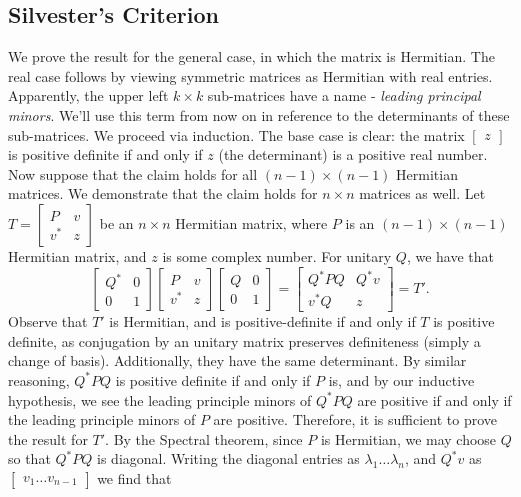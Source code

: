 \documentclass{scrartcl}
\begin{document}
\subsection{Silvester's Criterion}
\begin{solution}
    We prove the result for the general case, in which the matrix is Hermitian. The real case follows by viewing symmetric matrices as Hermitian with real entries. Apparently, the upper left $k\times k$ sub-matrices have a name - \textit{leading principal minors}. We'll use this term from now on in reference to the determinants of these sub-matrices. We proceed via induction. The base case is clear: the matrix $\begin{bmatrix} z \end{bmatrix}$ is positive definite if and only if $z$ (the determinant) is a positive real number. Now suppose that the claim holds for all $(n-1) \times (n-1)$ Hermitian matrices. We demonstrate that the claim holds for $n\times n$ matrices as well. Let $T=\begin{bmatrix} P & v \\ v^\ast & z \end{bmatrix}$ be an $n\times n$ Hermitian matrix, where $P$ is an $(n-1) \times (n-1)$ Hermitian matrix, and $z$ is some complex number. For unitary $Q$, we have that
    \[\begin{bmatrix} Q^\ast & 0 \\ 0 & 1 \end{bmatrix} \begin{bmatrix} P & v \\ v^\ast & z \end{bmatrix} \begin{bmatrix} Q & 0 \\ 0 & 1 \end{bmatrix}=\begin{bmatrix} {Q^\ast} P Q & Q^\ast v \\ v^\ast Q & z \end{bmatrix}=T'.\]
    Observe that $T'$ is Hermitian, and is positive-definite if and only if $T$ is positive definite, as conjugation by an unitary matrix preserves definiteness (simply a change of basis). Additionally, they have the same determinant. By similar reasoning, ${Q^\ast} P Q$ is positive definite if and only if $P$ is, and by our inductive hypothesis, we see the leading principle minors of ${Q^\ast} P Q$ are positive if and only if the leading principle minors of $P$ are positive. Therefore, it is sufficient to prove the result for $T'$. By the Spectral theorem, since $P$ is Hermitian, we may choose $Q$ so that $Q^\ast PQ$ is diagonal. Writing the diagonal entries as $\lambda_1 \dots \lambda_n$, and $Q^\ast v$ as $\begin{bmatrix} v_1 \dots v_{n-1} \end{bmatrix}$ we find that 

\end{solution}
\end{document}
